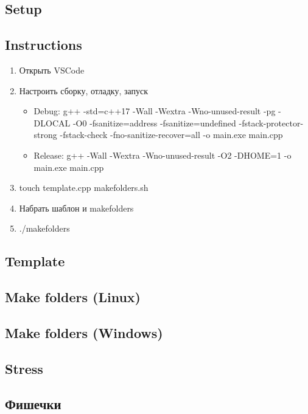 \documentclass[10pt]{article}
\begin{document}
\pagestyle{fancy}

\begin{multicols}{2}

\tableofcontents

\section{Setup}
\subsection{Instructions}
\begin{enumerate}
  \item Открыть VSCode
  \item Настроить сборку, отладку, запуск
  \begin{itemize}
    \item Debug: g++ -std=c++17 -Wall 
    -Wextra -Wno-unused-result -pg 
    -DLOCAL -O0 -fsanitize=address 
    -fsanitize=undefined 
    -fstack-protector-strong -fstack-check 
    -fno-sanitize-recover=all -o main.exe main.cpp
    \item Release: g++ -Wall -Wextra 
    -Wno-unused-result -O2 -DHOME=1 -o main.exe main.cpp
  \end{itemize}  
  \item touch template.cpp makefolders.sh
  \item Набрать шаблон и makefolders
  \item ./makefolders
\end{enumerate}
\subsection{Template}

\subsection{Make folders (Linux)}

\subsection{Make folders (Windows)}

\subsection{Stress}

\subsection{Фишечки}


\end{multicols}
\end{document}
